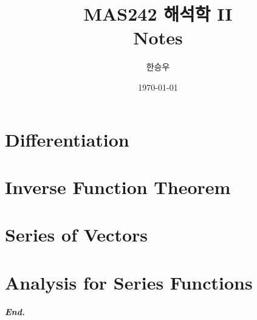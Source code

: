 \documentclass[a4paper,12pt]{report}
\title{\Huge{MAS242 해석학 II}\\Notes}
\author{\huge{한승우}}
\date{\today}
\begin{document}
\maketitle
\newpage
{}
\tikzexternaldisable
\tableofcontents
\tikzexternalenable
\pagebreak

\chapter{Differentiation}
 
\chapter{Inverse Function Theorem}
 
\chapter{Series of Vectors}
 
\chapter{Analysis for Series Functions}
 
\vfill
\begin{center}
    \textbf{\textit{End.}}
\end{center}
\end{document}
